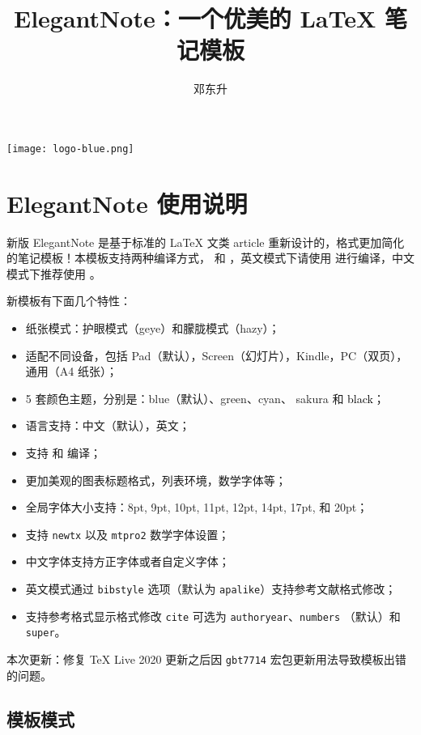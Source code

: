 \documentclass[cn,hazy,blue,14pt,screen]{elegantnote}
\title{ElegantNote：一个优美的 \LaTeX{} 笔记模板}
\author{邓东升}
\institute{Elegant\LaTeX{} Program}
\date{\zhtoday}
\begin{document}
\maketitle

\centerline{
    \texttt{[image: logo-blue.png]}
}


\section{ElegantNote 使用说明}

新版 ElegantNote 是基于标准的 \LaTeX{} 文类 article 重新设计的，格式更加简化的笔记模板！本模板支持两种编译方式， 和 ，英文模式下请使用  进行编译，中文模式下推荐使用 。

新模板有下面几个特性：

\begin{itemize}
    \item 纸张模式：护眼模式（geye）和朦胧模式（hazy）；
    \item 适配不同设备，包括 Pad（默认），Screen（幻灯片），Kindle，PC（双页），通用（A4 纸张）；
    \item 5 套颜色主题，分别是：\textcolor{eblue}{blue}（默认）、\textcolor{egreen}{green}、\textcolor{ecyan}{cyan}、 \textcolor{sakura}{sakura} 和 \textcolor{black}{black}；
    \item 语言支持：中文（默认），英文；
    \item 支持  和  编译；
    \item 更加美观的图表标题格式，列表环境，数学字体等；
    \item 全局字体大小支持：8pt, 9pt, 10pt, 11pt, 12pt, 14pt, 17pt, 和 20pt；
    \item 支持 \lstinline{newtx} 以及 \lstinline{mtpro2} 数学字体设置；
    \item 中文字体支持方正字体或者自定义字体；
    \item 英文模式通过 \lstinline{bibstyle} 选项（默认为 \lstinline{apalike}）支持参考文献格式修改；
    \item 支持参考格式显示格式修改 \lstinline{cite} 可选为 \lstinline{authoryear}、\lstinline{numbers} （默认）和 \lstinline{super}。
\end{itemize}

本次更新：修复 \TeX{} Live 2020 更新之后因 \lstinline{gbt7714} 宏包更新用法导致模板出错的问题。

\subsection{模板模式}
\end{document}
